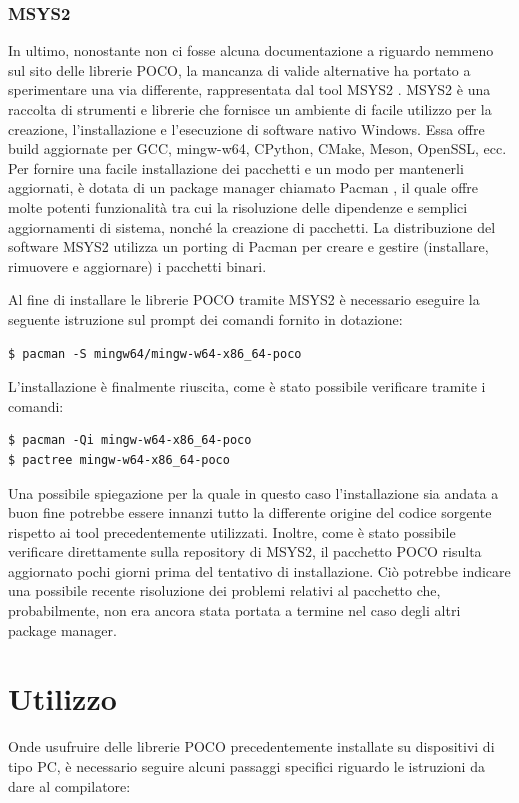 \subsubsection{MSYS2}
In ultimo, nonostante non ci fosse alcuna documentazione a riguardo nemmeno sul sito delle librerie POCO, la mancanza di valide alternative ha portato a sperimentare una via differente, rappresentata dal tool MSYS2 \cite{MSYS2}. MSYS2 è una raccolta di strumenti e librerie che fornisce un ambiente di facile utilizzo per la creazione, l'installazione e l'esecuzione di software nativo Windows. Essa offre build aggiornate per GCC, mingw-w64, CPython, CMake, Meson, OpenSSL, ecc. Per fornire una facile installazione dei pacchetti e un modo per mantenerli aggiornati, è dotata di un package manager chiamato Pacman \cite{Pacman}, il quale offre molte potenti funzionalità tra cui la risoluzione delle dipendenze e semplici aggiornamenti di sistema, nonché la creazione di pacchetti. La distribuzione del software MSYS2 utilizza un porting di Pacman per creare e gestire (installare, rimuovere e aggiornare) i pacchetti binari.

Al fine di installare le librerie POCO tramite MSYS2 è necessario eseguire la seguente istruzione sul prompt dei comandi fornito in dotazione:

\begin{verbatim}
$ pacman -S mingw64/mingw-w64-x86_64-poco
\end{verbatim}

L’installazione è finalmente riuscita, come è stato possibile verificare tramite i comandi:

\begin{verbatim}
$ pacman -Qi mingw-w64-x86_64-poco
$ pactree mingw-w64-x86_64-poco
\end{verbatim}

Una possibile spiegazione per la quale in questo caso l’installazione sia andata a buon fine potrebbe essere innanzi tutto la differente origine del codice sorgente rispetto ai tool precedentemente utilizzati. Inoltre, come è stato possibile verificare direttamente sulla repository di MSYS2, il pacchetto POCO risulta aggiornato pochi giorni prima del tentativo di installazione. Ciò potrebbe indicare una possibile recente risoluzione dei problemi relativi al pacchetto che, probabilmente, non era ancora stata portata a termine nel caso degli altri package manager.

\section{Utilizzo}\label{utilizzo}
Onde usufruire delle librerie POCO precedentemente installate su dispositivi di tipo PC, è necessario seguire alcuni passaggi specifici riguardo le istruzioni da dare al compilatore:

